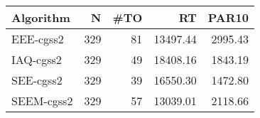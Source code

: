 \begin{tabular}{lrrrr}
\toprule
 Algorithm &   N &  \#TO &       RT &   PAR10 \\
\midrule
 EEE-cgss2 & 329 &   81 & 13497.44 & 2995.43 \\
 IAQ-cgss2 & 329 &   49 & 18408.16 & 1843.19 \\
 SEE-cgss2 & 329 &   39 & 16550.30 & 1472.80 \\
SEEM-cgss2 & 329 &   57 & 13039.01 & 2118.66 \\
\bottomrule
\end{tabular}
